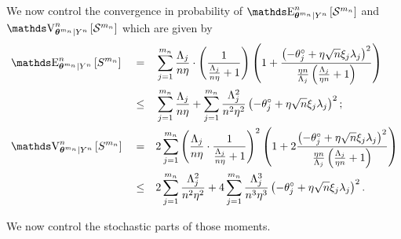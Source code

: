 \begin{pro}
We now control the convergence in probability of $\E_{\boldsymbol{\theta}^{m_{n}} \vert Y^{n}}^{n}\left[\mathcal{S}^{m_{n}}\right]$ and $\V_{\boldsymbol{\theta}^{m_{n}} \vert Y^{n}}^{n}\left[\mathcal{S}^{m_{n}}\right]$ which are given by
\begin{alignat*}{3}
&\E_{\boldsymbol{\theta}^{m_{n}} \vert Y^{n}}^{n}\left[S^{m_{n}}\right] &&=&& \sum\limits_{j = 1}^{m_{n}} \frac{\Lambda_{j}}{n \eta}\cdot \left(\frac{1}{\frac{\Lambda_{j}}{n \eta} + 1}\right)\left(1 + \frac{\left(- \theta^{\circ}_{j} + \eta \sqrt{n} \xi_{j} \lambda_{j}\right)^{2}}{\frac{\eta n}{\Lambda_{j}}\left(\frac{\Lambda_{j}}{\eta n} + 1\right)}\right)\\
& && \leq && \sum\limits_{j = 1}^{m_{n}} \frac{\Lambda_{j}}{n \eta} + \sum\limits_{j = 1}^{m_{n}} \frac{\Lambda_{j}^{2}}{n^{2} \eta^{2}}\left(- \theta^{\circ}_{j} + \eta \sqrt{n} \xi_{j} \lambda_{j}\right)^{2};\\
&\V_{\boldsymbol{\theta}^{m_{n}} \vert Y^{n}}^{n}\left[S^{m_{n}}\right] &&=&& 2 \sum\limits_{j = 1}^{m_{n}} \left(\frac{\Lambda_{j}}{n \eta}\cdot \frac{1}{\frac{\Lambda_{j}}{n \eta} + 1}\right)^{2}\left(1 + 2 \frac{\left(- \theta^{\circ}_{j} + \eta \sqrt{n} \xi_{j} \lambda_{j}\right)^{2}}{\frac{\eta n}{\Lambda_{j}}\left(\frac{\Lambda_{j}}{\eta n} + 1\right)}\right)\\
& &&\leq && 2 \sum\limits_{j = 1}^{m_{n}} \frac{\Lambda_{j}^{2}}{n^{2} \eta^{2}} + 4 \sum\limits_{j = 1}^{m_{n}} \frac{\Lambda_{j}^{3}}{n^{3} \eta^{3}} \left(- \theta^{\circ}_{j} + \eta \sqrt{n} \xi_{j} \lambda_{j}\right)^{2}.
\end{alignat*}

We now control the stochastic parts of those moments.


\end{pro}
